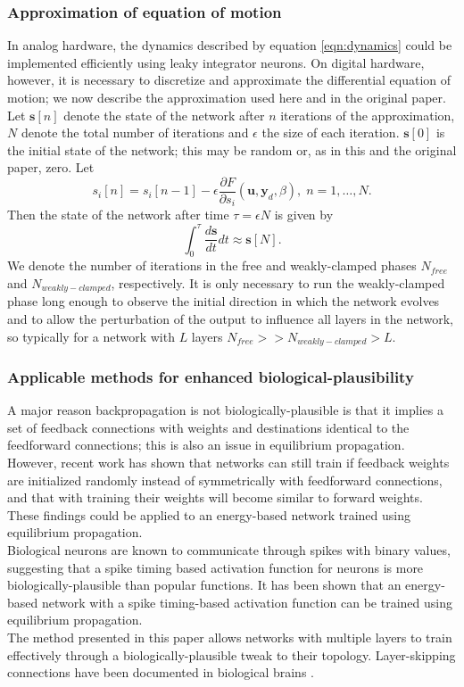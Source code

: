 \documentclass{article}
\newcommand{\mtx}[1]{\bm{#1}}
\newcommand{\npar}{\\\indent}
\begin{document}
\subsubsection{Approximation of equation of motion}

In analog hardware, the dynamics described by equation \ref{eqn:dynamics} could be implemented efficiently using leaky integrator neurons. On digital hardware, however, it is necessary to discretize and approximate the differential equation of motion; we now describe the approximation used here and in the original paper. Let $\mtx{s}[n]$ denote the state of the network after $n$ iterations of the approximation, $N$ denote the total number of iterations and $\epsilon$ the size of each iteration. $\mtx{s}[0]$ is the initial state of the network; this may be random or, as in this and the original paper, zero.  Let 
 \begin{equation}
 s_i[n]=s_i[n-1]-\epsilon \frac{\partial F}{\partial s_i}(\mtx{u},\mtx{y}_d,\beta),\;n=1,\hdots,N.
 \end{equation}
 Then the state of the network after time $\tau=\epsilon N$ is given by
\begin{equation}
\int_0^\tau\frac{d\mtx{s}}{dt}dt\approx \mtx{s}[N].
\end{equation}
 We denote the number of iterations in the free and weakly-clamped phases $N_{free}$ and $N_{weakly-clamped}$, respectively. It is only necessary to run the weakly-clamped phase long enough to observe the initial direction in which the network evolves and to allow the perturbation of the output to influence all layers in the network, so typically for a network with $L$ layers $N_{free}>>N_{weakly-clamped}>L$.
 
\subsubsection{Applicable methods for enhanced biological-plausibility}

A major reason backpropagation is not biologically-plausible is that it implies a set of feedback connections with weights and destinations identical to the feedforward connections; this is also an issue in equilibrium propagation. However, recent work \cite{lillicrap2014} has shown that networks can still train if feedback weights are initialized randomly instead of symmetrically with feedforward connections, and that with training their weights will become similar to forward weights. These findings could be applied to an energy-based network trained using equilibrium propagation.
\npar
Biological neurons are known to communicate through spikes with binary values, suggesting that a spike timing based activation function for neurons is more biologically-plausible than popular functions. It has been shown \cite{oconnor2018} that an energy-based network with a spike timing-based activation function can be trained using equilibrium propagation.
\npar
The method presented in this paper allows networks with multiple layers to train effectively through a biologically-plausible tweak to their topology. Layer-skipping connections have been documented in biological brains \cite{bullmore2009}.
\end{document}
